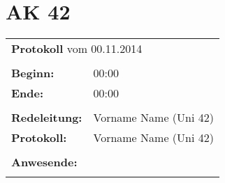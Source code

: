 \section{AK 42}						%

\begin{table}[h]
\begin{tabular}{p{2.5cm} l}
\multicolumn{2}{l}{\textbf{Protokoll} vom 00.11.2014} \\	%
& \\
\textbf{Beginn:} & 00:00 \\					%
\textbf{Ende:} & 00:00 \\					%
& \\
\textbf{Redeleitung:} & Vorname Name (Uni 42) \\				%
\textbf{Protokoll:} & Vorname Name (Uni 42) \\				%
& \\
\textbf{Anwesende:} & \\
\multicolumn{2}{p{0.9\textwidth}}{
}\\
\end{tabular}
\end{table}

